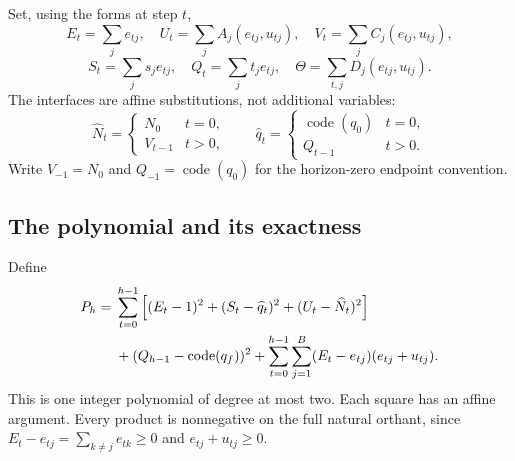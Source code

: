 \documentclass[11pt,letterpaper]{article}
\numberwithin{equation}{section}
\theoremstyle{definition}
\theoremstyle{remark}
\newcommand{\Q}{\mathbb Q}
\begin{document}
Set, using the forms at step $t$,
\[
E_t=\sum_j e_{tj},\quad U_t=\sum_j A_j(e_{tj},u_{tj}),\quad
V_t=\sum_j C_j(e_{tj},u_{tj}),
\]
\[
S_t=\sum_j s_j e_{tj},\quad Q_t=\sum_j t_j e_{tj},\quad
\Theta=\sum_{t,j}D_j(e_{tj},u_{tj}).
\]
The interfaces are affine substitutions, not additional variables:
\[
\widehat N_t=\begin{cases}N_0&t=0,\\V_{t-1}&t>0,\end{cases}
\qquad
\widehat q_t=\begin{cases}\operatorname{code}(q_0)&t=0,\\Q_{t-1}&t>0.\end{cases}
\]
Write $V_{-1}=N_0$ and $Q_{-1}=\operatorname{code}(q_0)$ for the horizon-zero endpoint convention.

\subsection{The polynomial and its exactness}

Define
\begin{align}
P_h={}&\sum_{t=0}^{h-1}\left[(E_t-1)^2+(S_t-\widehat q_t)^2
 +(U_t-\widehat N_t)^2\right]\notag\\
&+(Q_{h-1}-\operatorname{code}(q_f))^2
+\sum_{t=0}^{h-1}\sum_{j=1}^{B}(E_t-e_{tj})(e_{tj}+u_{tj}).\label{smc:tm:eq:certificate}
\end{align}
This is one integer polynomial of degree at most two. Each square has an affine argument. Every product is nonnegative on the full natural orthant, since $E_t-e_{tj}=\sum_{k\ne j}e_{tk}\ge0$ and $e_{tj}+u_{tj}\ge0$.
\end{document}
